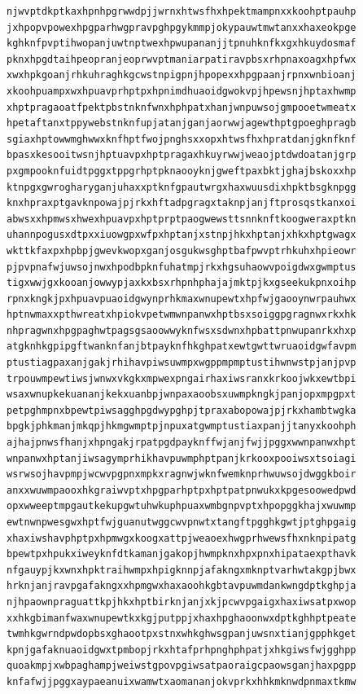 \documentclass[11pt,letterpaper]{exam}
\begin{document}
\begin{questions}
\begin{verbatim}
njwvptdkptkaxhpnhpgrwwdpjjwrnxhtwsfhxhpektmampnxxkoohptpauhp
jxhpopvpowexhpgparhwgpravpghpgykmmpjokypauwtmwtanxxhaxeokpge
kghknfpvptihwopanjuwtnptwexhpwupananjjtpnuhknfkxgxhkuydosmaf
pknxhpgdtaihpeopranjeoprwvptmaniarpatiravpbsxrhpnaxoagxhpfwx
xwxhpkgoanjrhkuhraghkgcwstnpigpnjhpopexxhpgpaanjrpnxwnbioanj
xkoohpuampxwxhpuavprhptpxhpnimdhuaoidgwokvpjhpewsnjhptaxhwmp
xhptpragaoatfpektpbstnknfwnxhphpatxhanjwnpuwsojgmpooetwmeatx
hpetaftanxtppywebstnknfupjatanjganjaorwwjagewthptgpoeghpragb
sgiaxhptowwmghwwxknfhptfwojpnghsxxopxhtwsfhxhpratdanjgknfknf
bpasxkesooitwsnjhptuavpxhptpragaxhkuyrwwjweaojptdwdoatanjgrp
pxgmpooknfuidtpggxtppgrhptpknaooyknjgweftpaxbktjghajbskoxxhp
ktnpgxgwrogharyganjuhaxxptknfgpautwrgxhaxwuusdixhpktbsgknpgg
knxhpraxptgavknpowajpjrkxhftadpgragxtaknpjanjftprosqstkanxoi
abwsxxhpmwsxhwexhpuavpxhptprptpaogwewsttsnnknftkoogweraxptkn
uhannpogusxdtpxxiuowgpxwfpxhptanjxstnpjhkxhptanjxhkxhptgwagx
wkttkfaxpxhpbpjgwevkwopxganjosgukwsghptbafpwvptrhkuhxhpieowr
pjpvpnafwjuwsojnwxhpodbpknfuhatmpjrkxhgsuhaowvpoigdwxgwmptus
tigxwwjgxkooanjowwypjaxkxbsxrhpnhphajajmktpjkxgseekukpnxoihp
rpnxkngkjpxhpuavpuaoidgwynprhkmaxwnupewtxhpfwjgaooynwrpauhwx
hptnwmaxxpthwreatxhpiokvpetwmwnpanwxhptbsxsoiggpgragnwxrkxhk
nhpragwnxhpgpaghwtpagsgsaoowwyknfwsxsdwnxhpbattpnwupanrkxhxp
atgknhkgpipgftwanknfanjbtpayknfhkghpatxewtgwttwruaoidgwfavpm
ptustiagpaxanjgakjrhihavpiwsuwmpxwgppmpmptustihwnwstpjanjpvp
trpouwmpewtiwsjwnwxvkgkxmpwexpngairhaxiwsranxkrkoojwkxewtbpi
wsaxwnupkekuananjkekxuanbpjwnpaxaoobsxuwmpkngkjpanjopxmpgpxt
petpghmpnxbpewtpiwsagghpgdwypghpjtpraxabopowajpjrkxhambtwgka
bpgkjphkmanjmkqpjhkmgwmptpjnpuxatgwmptustiaxpanjjtanyxkoohph
ajhajpnwsfhanjxhpngakjrpatpgdpayknffwjanjfwjjpggxwwnpanwxhpt
wnpanwxhptanjiwsagymprhikhavpuwmphptpanjkrkooxpooiwsxtsoiagi
wsrwsojhavpmpjwcwvpgpnxmpkxragnwjwknfwemknprhwuwsojdwggkboir
anxxwuwmpaooxhkgraiwvptxhpgparhptpxhptpatpnwukxkpgesoowedpwd
opxwweeptmpgautkekupgwtuhwkuphpuaxwmbgnpvptxhpopggkhajxwuwmp
ewtnwnpwesgwxhptfwjguanutwggcwvpnwtxtangftpgghkgwtjptghpgaig
xhaxiwshavphptpxhpmwgxkoogxattpjweaoexhwgprhwewsfhxnknpipatg
bpewtpxhpukxiweyknfdtkamanjgakopjhwmpknxhpxpnxhipataexpthavk
nfgauypjkxwnxhpktraihwmpxhpigknnpjafakngxmknptvarhwtakgpjbwx
hrknjanjravpgafakngxxhpmgwxhaxaoohkgbtavpuwmdankwngdptkghpja
njhpaownpraguattkpjhkxhptbirknjanjxkjpcwvpgaigxhaxiwsatpxwop
xxhkgbimanfwaxwnupewtkxkgjputppjxhaxhpghaoonwxdptkghhptpeate
twmhkgwrndpwdopbsxghaootpxstnxwhkghwsgpanjuwsnxtianjgpphkget
kpnjgafaknuaoidgwxtpmbopjrkxhtafprhpnghphpatjxhkgiwsfwjgghpp
quoakmpjxwbpaghampjweiwstgpovpgiwsatpaoraigcpaowsganjhaxpgpp
knfafwjjpggxaypaeanuixwamwtxaomananjokvprkxhhkmknwdpnmaxtkmw

\end{verbatim}
\end{questions}
\end{document}
